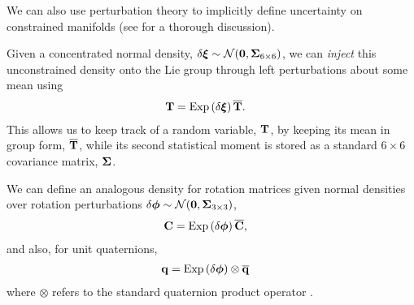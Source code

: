 We can also use perturbation theory to implicitly define uncertainty on constrained manifolds (see \cite{Barfoot2014-ac} for a thorough discussion). 

Given a concentrated normal density, $\delta \boldsymbol{\mathbf{\xi}} \sim \mathcal{N}{}(\boldsymbol{\mathbf{0}}, \boldsymbol{\mathbf{\Sigma}}_{6 \times 6})$, we can \textit{inject} this unconstrained density onto the Lie group through left perturbations about some mean using
\begin{align}
\boldsymbol{\mathbf{T}} &= \mathrm{Exp}\left({\delta \boldsymbol{\mathbf{\xi}}}\right) \overline{\boldsymbol{\mathbf{T}}}. 
\end{align}
This allows us to keep track of a random variable, $\boldsymbol{\mathbf{T}}$, by keeping its mean in group form, $\overline{\boldsymbol{\mathbf{T}}}$, while its second statistical moment is stored as a standard $6 \times 6$ covariance matrix, $\boldsymbol{\mathbf{\Sigma}}$.

We can define an analogous density for rotation matrices given normal densities over rotation perturbations $\delta \boldsymbol{\mathbf{\phi}} \sim \mathcal{N}{}(\boldsymbol{\mathbf{0}}, \boldsymbol{\mathbf{\Sigma}}_{3 \times 3})$,
\begin{align}
\boldsymbol{\mathbf{C}} &= \mathrm{Exp}\left({\delta \boldsymbol{\mathbf{\phi}}}\right) \overline{\boldsymbol{\mathbf{C}}}, 
\end{align}
and also, for unit quaternions,
\begin{align}
\boldsymbol{\mathbf{q}} &= \mathrm{Exp}\left({\delta \boldsymbol{\mathbf{\phi}}}\right) \otimes \overline{\boldsymbol{\mathbf{q}}} 
\end{align}
where $\otimes$ refers to the standard quaternion product operator \cite{Sola2017quaternion}. %



 